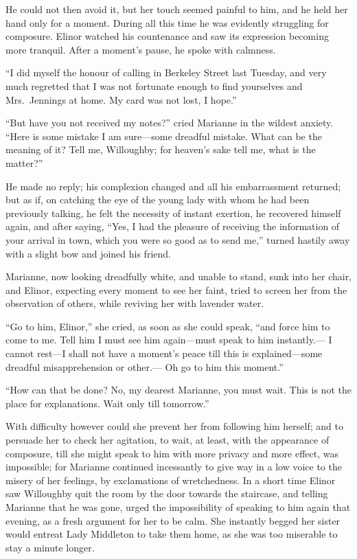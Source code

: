 \documentclass{article}
\begin{document}
He could not then avoid it, but her touch seemed
painful to him, and he held her hand only for a moment.
During all this time he was evidently struggling for composure.
Elinor watched his countenance and saw its expression
becoming more tranquil.  After a moment's pause, he spoke
with calmness.

``I did myself the honour of calling in Berkeley
Street last Tuesday, and very much regretted that I was
not fortunate enough to find yourselves and Mrs.\ Jennings
at home.  My card was not lost, I hope.''

``But have you not received my notes?'' cried Marianne
in the wildest anxiety.  ``Here is some mistake I am
sure---some dreadful mistake.  What can be the meaning
of it?  Tell me, Willoughby; for heaven's sake tell me,
what is the matter?''

He made no reply; his complexion changed and all his
embarrassment returned; but as if, on catching the eye
of the young lady with whom he had been previously talking,
he felt the necessity of instant exertion, he recovered
himself again, and after saying, ``Yes, I had the pleasure
of receiving the information of your arrival in town,
which you were so good as to send me,'' turned hastily away
with a slight bow and joined his friend.

Marianne, now looking dreadfully white, and unable
to stand, sunk into her chair, and Elinor, expecting every
moment to see her faint, tried to screen her from the
observation of others, while reviving her with lavender water.

``Go to him, Elinor,'' she cried, as soon as she
could speak, ``and force him to come to me.  Tell him
I must see him again---must speak to him instantly.---%
I cannot rest---I shall not have a moment's peace till this
is explained---some dreadful misapprehension or other.---%
Oh go to him this moment.''

``How can that be done? No, my dearest Marianne,
you must wait.  This is not the place for explanations.
Wait only till tomorrow.''

With difficulty however could she prevent her
from following him herself; and to persuade her to check
her agitation, to wait, at least, with the appearance
of composure, till she might speak to him with more privacy
and more effect, was impossible; for Marianne continued
incessantly to give way in a low voice to the misery
of her feelings, by exclamations of wretchedness.
In a short time Elinor saw Willoughby quit the room by the
door towards the staircase, and telling Marianne that he
was gone, urged the impossibility of speaking to him again
that evening, as a fresh argument for her to be calm.
She instantly begged her sister would entreat Lady
Middleton to take them home, as she was too miserable
to stay a minute longer.
\end{document}
